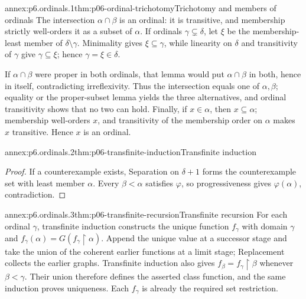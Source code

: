 \begin{annexitem}{annex:p6.ordinals.1}{thm:p06-ordinal-trichotomy}{Trichotomy and members of ordinals}
The intersection \(\alpha\cap\beta\) is an ordinal: it is transitive, and
membership strictly well-orders it as a subset of \(\alpha\).  If ordinals
\(\gamma\subsetneq\delta\), let \(\xi\) be the membership-least member of
\(\delta\setminus\gamma\).  Minimality gives \(\xi\subseteq\gamma\), while
linearity on \(\delta\) and transitivity of \(\gamma\) give
\(\gamma\subseteq\xi\); hence \(\gamma=\xi\in\delta\).

If \(\alpha\cap\beta\) were proper in both ordinals, that lemma would put
\(\alpha\cap\beta\) in both, hence in itself, contradicting irreflexivity.
Thus the intersection equals one of \(\alpha,\beta\); equality or the
proper-subset lemma yields the three alternatives, and ordinal transitivity
shows that no two can hold.  Finally, if \(x\in\alpha\), then
\(x\subseteq\alpha\); membership well-orders \(x\), and transitivity of the
membership order on \(\alpha\) makes \(x\) transitive.  Hence \(x\) is an
ordinal.
\end{annexitem}

\begin{annexitem}{annex:p6.ordinals.2}{thm:p06-transfinite-induction}{Transfinite induction}
\begin{proof}
If a counterexample exists, Separation on \(\delta+1\) forms the counterexample
set with least member \(\alpha\).  Every \(\beta<\alpha\) satisfies
\(\varphi\), so progressiveness gives \(\varphi(\alpha)\), contradiction.
\end{proof}
\end{annexitem}

\begin{annexitem}{annex:p6.ordinals.3}{thm:p06-transfinite-recursion}{Transfinite recursion}
For each ordinal \(\gamma\), transfinite induction constructs the unique
function \(f_\gamma\) with domain \(\gamma\) and
\(f_\gamma(\alpha)=G(f_\gamma\mathbin{\upharpoonright}\alpha)\).  Append the
unique value at a successor stage and take the union of the coherent earlier
functions at a limit stage; Replacement collects the earlier graphs.
Transfinite induction also gives
\(f_\beta=f_\gamma\mathbin{\upharpoonright}\beta\) whenever
\(\beta<\gamma\).  Their union therefore defines the asserted class function,
and the same induction proves uniqueness.  Each \(f_\gamma\) is already the
required set restriction.
\end{annexitem}

